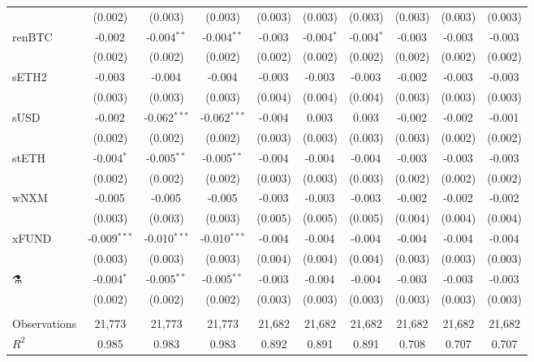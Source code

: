 \begin{table}[!htbp]
\begin{tabular}{@{\extracolsep{5pt}}lccccccccc}
  & (0.002) & (0.003) & (0.003) & (0.003) & (0.003) & (0.003) & (0.003) & (0.003) & (0.003) \\
 renBTC & -0.002$^{}$ & -0.004$^{**}$ & -0.004$^{**}$ & -0.003$^{}$ & -0.004$^{*}$ & -0.004$^{*}$ & -0.003$^{}$ & -0.003$^{}$ & -0.003$^{}$ \\
  & (0.002) & (0.002) & (0.002) & (0.002) & (0.002) & (0.002) & (0.002) & (0.002) & (0.002) \\
 sETH2 & -0.003$^{}$ & -0.004$^{}$ & -0.004$^{}$ & -0.003$^{}$ & -0.003$^{}$ & -0.003$^{}$ & -0.002$^{}$ & -0.003$^{}$ & -0.003$^{}$ \\
  & (0.003) & (0.003) & (0.003) & (0.004) & (0.004) & (0.004) & (0.003) & (0.003) & (0.003) \\
 sUSD & -0.002$^{}$ & -0.062$^{***}$ & -0.062$^{***}$ & -0.004$^{}$ & 0.003$^{}$ & 0.003$^{}$ & -0.002$^{}$ & -0.002$^{}$ & -0.001$^{}$ \\
  & (0.002) & (0.002) & (0.002) & (0.003) & (0.003) & (0.003) & (0.003) & (0.002) & (0.002) \\
 stETH & -0.004$^{*}$ & -0.005$^{**}$ & -0.005$^{**}$ & -0.004$^{}$ & -0.004$^{}$ & -0.004$^{}$ & -0.003$^{}$ & -0.003$^{}$ & -0.003$^{}$ \\
  & (0.002) & (0.002) & (0.002) & (0.003) & (0.003) & (0.003) & (0.002) & (0.002) & (0.002) \\
 wNXM & -0.005$^{}$ & -0.005$^{}$ & -0.005$^{}$ & -0.003$^{}$ & -0.003$^{}$ & -0.003$^{}$ & -0.002$^{}$ & -0.002$^{}$ & -0.002$^{}$ \\
  & (0.003) & (0.003) & (0.003) & (0.005) & (0.005) & (0.005) & (0.004) & (0.004) & (0.004) \\
 xFUND & -0.009$^{***}$ & -0.010$^{***}$ & -0.010$^{***}$ & -0.004$^{}$ & -0.004$^{}$ & -0.004$^{}$ & -0.004$^{}$ & -0.004$^{}$ & -0.004$^{}$ \\
  & (0.003) & (0.003) & (0.003) & (0.004) & (0.004) & (0.004) & (0.003) & (0.003) & (0.003) \\
 ⚗️ & -0.004$^{*}$ & -0.005$^{**}$ & -0.005$^{**}$ & -0.003$^{}$ & -0.004$^{}$ & -0.004$^{}$ & -0.003$^{}$ & -0.003$^{}$ & -0.003$^{}$ \\
  & (0.002) & (0.002) & (0.002) & (0.003) & (0.003) & (0.003) & (0.003) & (0.003) & (0.003) \\
\hline \\[-1.8ex]
 Observations & 21,773 & 21,773 & 21,773 & 21,682 & 21,682 & 21,682 & 21,682 & 21,682 & 21,682 \\
 $R^2$ & 0.985 & 0.983 & 0.983 & 0.892 & 0.891 & 0.891 & 0.708 & 0.707 & 0.707 \\

\end{tabular}
\end{table}
